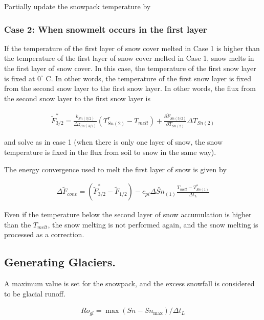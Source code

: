 Partially update the snowpack temperature by

\hypertarget{case-2-when-snowmelt-occurs-in-the-first-layer}{%
\subsubsection{Case 2: When snowmelt occurs in the first
layer}\label{case-2-when-snowmelt-occurs-in-the-first-layer}}

If the temperature of the first layer of snow cover melted in Case 1 is
higher than the temperature of the first layer of snow cover melted in
Case 1, snow melts in the first layer of snow cover. In this case, the
temperature of the first snow layer is fixed at \(0^{\circ}\) C. In
other words, the temperature of the first snow layer is fixed from the
second snow layer to the first snow layer. In other words, the flux from
the second snow layer to the first snow layer is

\begin{eqnarray}
 \widetilde{F}_{3/2}^{*} =
\frac{k_{Sn(3/2)}}{\Delta z_{Sn(3/2)}} (T_{Sn(2)}^{\tau} - T_{melt})
+\frac{\partial \widetilde{F}_{Sn(3/2)}}{\partial T_{Sn(2)}}
 \Delta T_{Sn(2)}
\end{eqnarray}

and solve as in case 1 (when there is only one layer of snow, the snow
temperature is fixed in the flux from soil to snow in the same way).

The energy convergence used to melt the first layer of snow is given by

\begin{eqnarray}
 \Delta \widetilde{F}_{conv} = (\widetilde{F}_{3/2}^{*} - \widetilde{F}_{1/2})
  - c_{pi}\Delta \widetilde{Sn}_{(1)} \frac{T_{melt}-T_{Sn(1)}^*}{\Delta t_L}
\end{eqnarray}

Even if the temperature below the second layer of snow accumulation is
higher than the \(T_{melt}\), the snow melting is not performed again,
and the snow melting is processed as a correction.

\hypertarget{generating-glaciers.}{%
\subsection{Generating Glaciers.}\label{generating-glaciers.}}

A maximum value is set for the snowpack, and the excess snowfall is
considered to be glacial runoff.

\begin{eqnarray}
 Ro_{gl} = \max( Sn - Sn_{\max} ) / \Delta t_L
\end{eqnarray}

